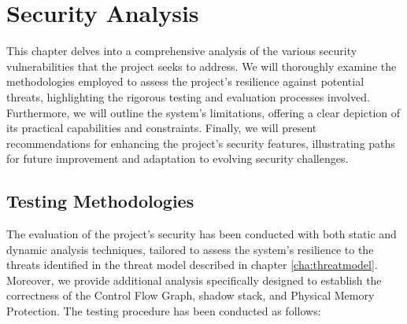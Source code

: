 \chapter{Security Analysis}
\label{cha:ta}

This chapter delves into a comprehensive analysis of the various security
vulnerabilities that the project seeks to address. We will thoroughly examine the
methodologies employed to assess the project's resilience against potential threats,
highlighting the rigorous testing and evaluation processes involved. Furthermore,
we will outline the system's limitations, offering a clear depiction of its practical
capabilities and constraints. Finally, we will present recommendations for enhancing
the project's security features, illustrating paths for future improvement and
adaptation to evolving security challenges.

\section{Testing Methodologies}
\label{sec:ta_methodologies}

The evaluation of the project's security has been conducted with both static and
dynamic analysis techniques, tailored to assess the system's resilience to the
threats identified in the threat model described in chapter
\ref{cha:threatmodel}. Moreover, we provide additional analysis specifically
designed to establish the correctness of the Control Flow Graph, shadow stack,
and Physical Memory Protection. The testing procedure has been conducted as follows:

